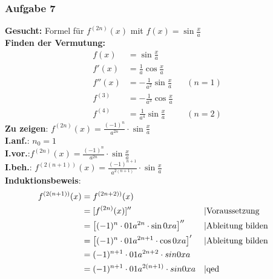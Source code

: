 \subsubsection{Aufgabe 7}
\textbf{Gesucht:} Formel für $ f^{(2n)}(x) $ mit $ f(x)=\sin \frac{x}{a}$ \\
\textbf{Finden der Vermutung:}\begin{align*}
f(x)		&= \sin \frac{x}{a}\\
f'(x)		&= \frac{1}{a} \cos \frac{x}{a}\\
f''(x)	&= -\frac{1}{a^2}\sin \frac{x}{a} &&(n=1)\\
f^{(3)}	&= -\frac{1}{a^3}\cos \frac{x}{a}\\
f^{(4)}	&= \frac{1}{a^4}\sin \frac{x}{a} &&(n=2)\end{align*}
\textbf{Zu zeigen}: $ f^{(2n)}(x) =  \frac{(-1)^n}{a^{2n}} \cdot \sin \frac{x}{a} $\\
\textbf{I.anf.}: $ n_0 = 1 $\\
\textbf{I.vor.}:$ f^{(2n)}(x) = \frac{(-1)^n}{a^{2n}} \cdot \sin \frac{x}{a} $\\
\textbf{I.beh.}: $ f^{(2(n+1))}(x) = \frac{(-1)^{n+1}}{a^{2(n+1)}} \cdot \sin \frac{x}{a} $\\
\textbf{Induktionsbeweis}:\begin{align*}
f^{(2(n+1))}(x) &= f^{(2n+2))}(x) \\
								&= [f^{(2n)}(x)]'' && \text{\textbar Voraussetzung}\\
								&= \left[ (-1)^n \cdot \frac{1}{a^{2n}} \cdot \sin \frac{x}{a} \right]'' && \text{\textbar Ableitung bilden}\\
								&= \left[ (-1)^n \cdot \frac{1}{a^{2n+1}} \cdot \cos \frac{x}{a} \right]' && \text{\textbar Ableitung bilden}\\
								&= (-1)^{n+1} \cdot \frac{1}{a^{2n+2}} \cdot sin \frac{x}{a} \\
								&= (-1)^{n+1} \cdot \frac{1}{a^{2(n+1)}} \cdot sin \frac{x}{a} && \text{\textbar qed}\end{align*}